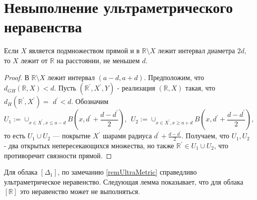 \documentclass[11pt,twoside,draft
]{article}
\begin{document}
\section{Невыполнение ультраметрического неравенства}
\begin{lemma}
  Если $X$ является подмножеством прямой и в $\mathbb{R}\setminus X$
  лежит интервал диаметра $2d$,
  то $X$ лежит от $\mathbb{R}$ на расстоянии, не меньшем $d$.
  \label{lemmaDiamDist}
\end{lemma}
\begin{proof}В $\mathbb{R} \setminus X$ лежит интервал $(a-d, a+d)$.
  Предположим, что $d_{G H}(\mathbb{R}, X)<d$. Пусть
  $\left(\mathbb{R}^{\prime}, X^{\prime}, Y\right)$ - реализация
  $(\mathbb{R}, X)$ такая, что $d_H\left(\mathbb{R}^{\prime},
  X^{\prime}\right)=$ $d^{\prime}<d$. Обозначим \[U_1:=\cup_{x \in
    X^{\prime}, x \leqslant a-d} B\left(x,
    d^{\prime}+\frac{d-d^{\prime}}{2}\right),~~ U_2:=\cup_{x \in
    X^{\prime}, x \geqslant a+d} B\left(x,
  d^{\prime}+\frac{d-d^{\prime}}{2}\right),\]
  то есть $U_1 \cup U_2$ --- покрытие $X^{\prime}$ шарами радиуса
  $d^\prime + \frac{d-d^{\prime}}{2}$.
  Получаем, что $U_1, U_2$ - два открытых непересекающихся множества,
  но также $\mathbb{R}^{\prime} \in U_1 \cup U_2$, что противоречит
  связности прямой.
\end{proof}
Для облака $[\Delta_{1}]$, по замечанию \ref{remUltraMetric} справедливо
ультраметрическое неравенство.
Следующая лемма показывает, что для облака $[\mathbb{R}]$
это неравенство может не выполняться.
\end{document}
